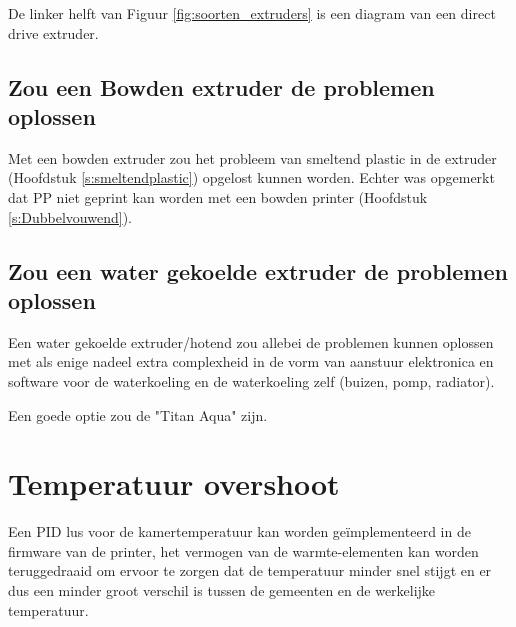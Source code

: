De linker helft van Figuur \ref{fig:soorten_extruders} \cite{soorten_extruders}
is een diagram van een direct drive extruder.


\subsection{Zou een Bowden extruder de problemen oplossen}

Met een bowden extruder zou het probleem van smeltend plastic in de extruder
(Hoofdstuk \ref{s:smeltendplastic}) opgelost kunnen worden. Echter was
opgemerkt dat PP niet geprint kan worden met een bowden printer (Hoofdstuk
\ref{s:Dubbelvouwend}).

\subsection{Zou een water gekoelde extruder de problemen oplossen}

Een water gekoelde extruder/hotend zou allebei de problemen kunnen oplossen met
als enige nadeel extra complexheid in de vorm van aanstuur elektronica en
software voor de waterkoeling en de waterkoeling zelf (buizen, pomp, radiator).

Een goede optie zou de "Titan Aqua" \cite{titanaqua} zijn.


\section{Temperatuur overshoot}

Een \ac{PID} lus voor de kamertemperatuur kan worden geïmplementeerd in de
firmware van de printer, het vermogen van de warmte-elementen kan worden
teruggedraaid om ervoor te zorgen dat de temperatuur minder snel stijgt en er
dus een minder groot verschil is tussen de gemeenten en de werkelijke
temperatuur.
